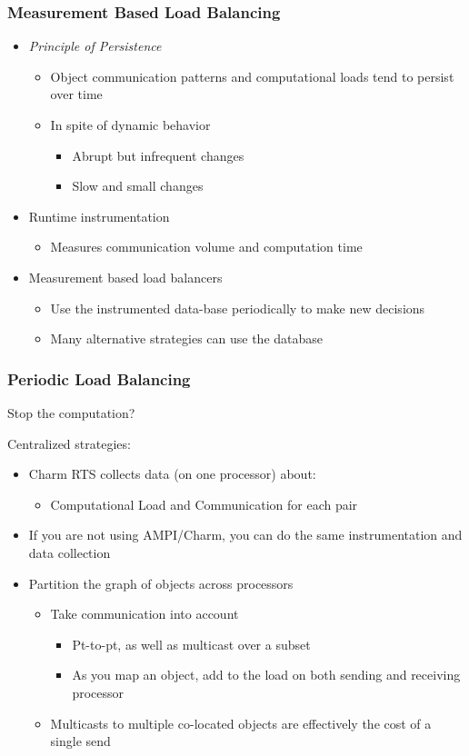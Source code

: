 \begin{frame}[fragile]
\frametitle{Measurement Based Load Balancing}
\begin{itemize}
 \item \emph{Principle of Persistence}
 \begin{itemize}
  \item Object communication patterns and computational loads tend to persist over time
  \item In spite of dynamic behavior
  \begin{itemize}
   \item Abrupt but infrequent changes
   \item Slow and small changes
  \end{itemize}
 \end{itemize}
\item Runtime instrumentation
\begin{itemize}
 \item Measures communication volume and computation time
\end{itemize}
\item Measurement based load balancers
\begin{itemize}
 \item Use the instrumented data-base periodically to make new decisions
 \item Many alternative strategies can use the database
\end{itemize}
\end{itemize}
\end{frame}

\begin{frame}[fragile]
\frametitle{Periodic Load Balancing}

Stop the computation?

Centralized strategies:
\begin{itemize}
 \item Charm RTS collects data (on one processor) about:
 \begin{itemize}
  \item Computational Load and Communication for each pair
 \end{itemize}
 \item If you are not using AMPI/Charm, you can do the same instrumentation and data collection
 \item Partition the graph of objects across processors
 \begin{itemize}
  \item Take communication into account
  \begin{itemize}
   \item Pt-to-pt, as well as multicast over a subset
   \item As you map an object, add to the load on both sending and receiving processor
  \end{itemize}
  \item Multicasts to multiple co-located objects are effectively the cost of a single send
 \end{itemize}
\end{itemize}
\end{frame}

